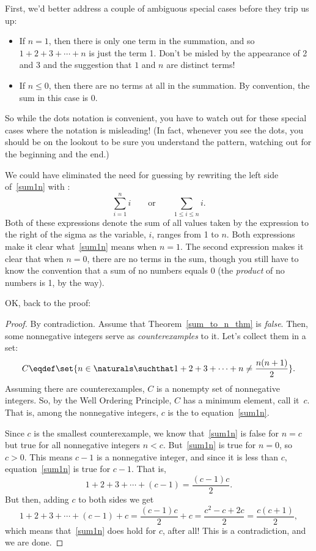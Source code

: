 First, we'd better address a couple of ambiguous special
cases before they trip us up:
%
\begin{itemize}
%
\item If $n = 1$, then there is only one term in the summation, and so $1
  + 2 + 3 + \cdots + n$ is just the term 1.  Don't be misled by the
  appearance of 2 and 3 and the suggestion that $1$ and $n$ are distinct
  terms!
%
\item If $n \leq 0$, then there are no terms at all in the summation.  By
convention, the sum in this case is 0.
%
\end{itemize}
%
So while the dots notation is convenient, you have to watch out for these
special cases where the notation is misleading!  (In fact, whenever you
see the dots, you should be on the lookout to be sure you understand the
pattern, watching out for the beginning and the end.)

We could have eliminated the need for guessing by rewriting the left side
of~\eqref{sum1n} with :
\[
\sum_{i=1}^n i
\qquad \text{or} \qquad
\sum_{1 \leq i \leq n} i.
\]
Both of these expressions denote the sum of all values taken by the
expression to the right of the sigma as the variable, $i$, ranges from 1
to $n$.  Both expressions make it clear what~\eqref{sum1n} means when
$n=1$.  The second expression makes it clear that when $n=0$, there are no
terms in the sum, though you still have to know the convention that a sum
of no numbers equals 0 (the \emph{product} of no numbers is 1, by the
way).

OK, back to the proof:

\begin{proof}
By contradiction.  Assume that Theorem~\ref{sum_to_n_thm} is
\emph{false}.  Then, some nonnegative integers serve as
\emph{counterexamples} to it. Let's collect them in a set:
\[
C \eqdef \set{n\in\naturals \suchthat 
        1 + 2 + 3 + \cdots + n \neq \frac{n(n+1)}{2}}.
\]
Assuming there are counterexamples, $C$ is a nonempty set of
nonnegative integers.  So, by the Well Ordering Principle, $C$ has a
minimum element, call it~$c$.  That is, among the nonnegative
integers, $c$ is the \emph{} to
equation~\eqref{sum1n}.

Since $c$ is the smallest counterexample, we know that~\eqref{sum1n} is
false for $n=c$ but true for all nonnegative integers $n<c$.
But~\eqref{sum1n} is true for $n=0$, so $c > 0$.  This means $c-1$ is a
nonnegative integer, and since it is less than $c$, equation~\eqref{sum1n}
is true for $c-1$.  That is,
\[
        1 + 2 + 3 + \cdots + (c-1) = \frac{(c-1)c}{2}.
\]
But then, adding $c$ to both sides we get
\[
1 + 2 + 3 + \cdots + (c-1) + c 
        = \frac{(c-1)c}{2} + c
        = \frac{c^2 - c + 2c}{2} 
        = \frac{c(c+1)}{2},
\]
which means that~\eqref{sum1n} does hold for $c$, after all!  This is a
contradiction, and we are done.
\end{proof}


